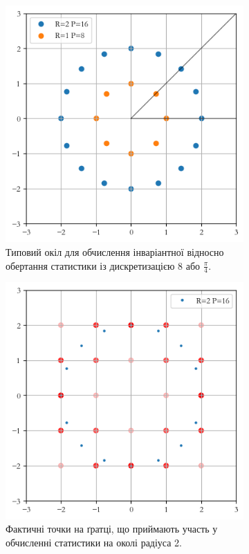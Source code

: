 \begin{figure}[h]
    \begin{subfigure}{0.48\textwidth}
    \includegraphics[width=0.9\linewidth]{img/clique-2.png} 
    \caption{
        Типовий окіл для обчислення інваріантної відносно обертання статистики із дискретизацією 8 або $\frac{\pi}{4}$. 
    }
    \label{fig:clique-2a}
    \end{subfigure}%
    \hfill
    \begin{subfigure}{0.48\textwidth}
    \includegraphics[width=0.9\linewidth]{img/clique-2-interp.png}
    \caption{
        Фактичні точки на ґратці, що приймають участь у обчисленні статистики на околі радіуса 2.
    }
    \label{fig:clique-2b}
    \end{subfigure}
    
    \caption{}
    \label{fig:clique-2}
\end{figure}

